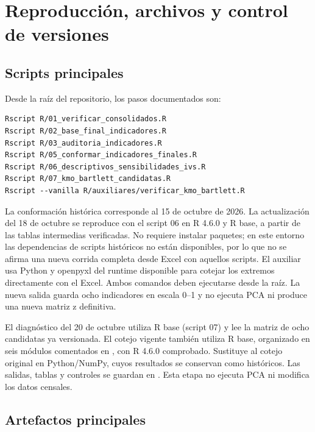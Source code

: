\section{Reproducción, archivos y control de versiones}
\label{anexo:reproducibilidad}
\begin{singlespace}\small

\subsection{Scripts principales}

Desde la raíz del repositorio, los pasos documentados son:
\begin{verbatim}
Rscript R/01_verificar_consolidados.R
Rscript R/02_base_final_indicadores.R
Rscript R/03_auditoria_indicadores.R
Rscript R/05_conformar_indicadores_finales.R
Rscript R/06_descriptivos_sensibilidades_ivs.R
Rscript R/07_kmo_bartlett_candidatas.R
Rscript --vanilla R/auxiliares/verificar_kmo_bartlett.R
\end{verbatim}

La conformación histórica corresponde al 15 de octubre de 2026. La actualización del 18 de octubre se reproduce con el script 06 en R 4.6.0 y R base, a partir de las tablas intermedias verificadas. No requiere instalar paquetes; en este entorno las dependencias de scripts históricos no están disponibles, por lo que no se afirma una nueva corrida completa desde Excel con aquellos scripts. El auxiliar  usa Python y openpyxl del runtime disponible para cotejar los extremos directamente con el Excel. Ambos comandos deben ejecutarse desde la raíz. La nueva salida guarda ocho indicadores en escala 0--1 y no ejecuta PCA ni produce una nueva matriz z definitiva.

El diagnóstico del 20 de octubre utiliza R base (script 07) y lee la matriz de ocho candidatas ya versionada. El cotejo vigente también utiliza R base, organizado en seis módulos comentados en , con R 4.6.0 comprobado. Sustituye al cotejo original en Python/NumPy, cuyos resultados se conservan como históricos. Las salidas, tablas y controles se guardan en . Esta etapa no ejecuta PCA ni modifica los datos censales.

\subsection{Artefactos principales}


\end{singlespace}
